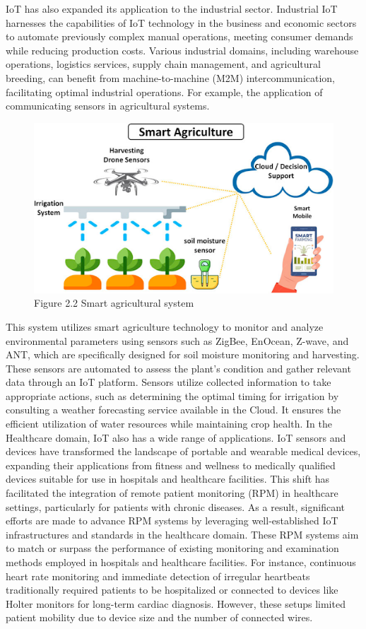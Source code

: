 IoT has also expanded its application to the industrial sector. Industrial IoT harnesses the capabilities of IoT technology in the business and economic sectors to automate previously complex manual operations, meeting consumer demands while reducing production costs. Various industrial domains, including warehouse operations, logistics services, supply chain management, and agricultural breeding, can benefit from machine-to-machine (M2M) intercommunication, facilitating optimal industrial operations. For example, the application of communicating sensors in agricultural systems. 

\begin{center}
    \begin{figure}[!htp]
        \centering
        \includegraphics[width=0.8 \textwidth]{image/smart_argi.png}
        \caption{Figure 2.2 Smart agricultural system}
        \label{subsection}
    \end{figure}
    \end{center}
This system utilizes smart agriculture technology to monitor and analyze environmental parameters using sensors such as ZigBee, EnOcean, Z-wave, and ANT, which are specifically designed for soil moisture monitoring and harvesting. These sensors are automated to assess the plant's condition and gather relevant data through an IoT platform. Sensors utilize collected information to take appropriate actions, such as determining the optimal timing for irrigation by consulting a weather forecasting service available in the Cloud. It ensures the efficient utilization of water resources while maintaining crop health.
In the Healthcare domain, IoT also has a wide range of applications. IoT sensors and devices have transformed the landscape of portable and wearable medical devices, expanding their applications from fitness and wellness to medically qualified devices suitable for use in hospitals and healthcare facilities. This shift has facilitated the integration of remote patient monitoring (RPM) in healthcare settings, particularly for patients with chronic diseases. As a result, significant efforts are made to advance RPM systems by leveraging well-established IoT infrastructures and standards in the healthcare domain. These RPM systems aim to match or surpass the performance of existing monitoring and examination methods employed in hospitals and healthcare facilities.  For instance, continuous heart rate monitoring and immediate detection of irregular heartbeats traditionally required patients to be hospitalized or connected to devices like Holter monitors for long-term cardiac diagnosis. 
However, these setups limited patient mobility due to device size and the number of connected wires.


